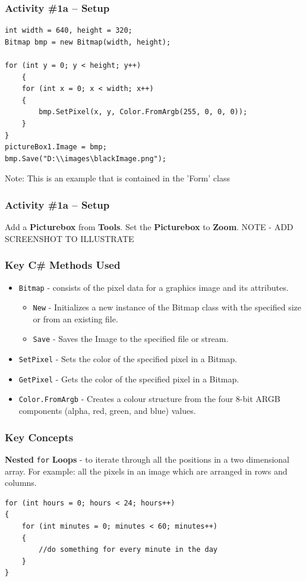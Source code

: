 \begin{frame}[fragile]
	\frametitle{Activity \#1a -- Setup}
	
\begin{lstlisting}
int width = 640, height = 320;
Bitmap bmp = new Bitmap(width, height);

for (int y = 0; y < height; y++)
	{
	for (int x = 0; x < width; x++)
	{
		bmp.SetPixel(x, y, Color.FromArgb(255, 0, 0, 0));
	}
}
pictureBox1.Image = bmp;
bmp.Save("D:\\images\blackImage.png");
\end{lstlisting}
Note: This is an example that is contained in the 'Form' class
\end{frame}
\begin{frame}[fragile]
	\frametitle{Activity \#1a -- Setup}
	
Add a \textbf{Picturebox} from \textbf{Tools}. Set the \textbf{Picturebox} to \textbf{Zoom}.
NOTE - ADD SCREENSHOT TO ILLUSTRATE
\end{frame}

\begin{frame}
		\frametitle{Key C\# Methods Used}
			\begin{itemize}		
			\item \texttt{Bitmap} - consists of the pixel data for a graphics image and its attributes.
				\begin{itemize}	
					\item \texttt{New} - Initializes a new instance of the Bitmap class with the specified size or from an existing file.
					\item \texttt{Save} - Saves the Image to the specified file or stream.
				\end{itemize}	
			\item \texttt{SetPixel} - Sets the color of the specified pixel in a Bitmap.
			\item \texttt{GetPixel} - Gets the color of the specified pixel in a Bitmap.
			\item \texttt{Color.FromArgb} - Creates a colour structure from the four 8-bit ARGB components (alpha, red, green, and blue) values.	
			\end{itemize}
\end{frame}	

\begin{frame}[fragile]
	\frametitle{Key Concepts}
	
	\textbf{Nested} \texttt{for} \textbf{Loops} - to iterate through all the positions in a two dimensional array. For example: all the pixels in an image which are arranged in rows and columns.
	
	\begin{lstlisting}
for (int hours = 0; hours < 24; hours++)
{
	for (int minutes = 0; minutes < 60; minutes++)
	{
		//do something for every minute in the day
	}
}
	\end{lstlisting}
	
\end{frame}

